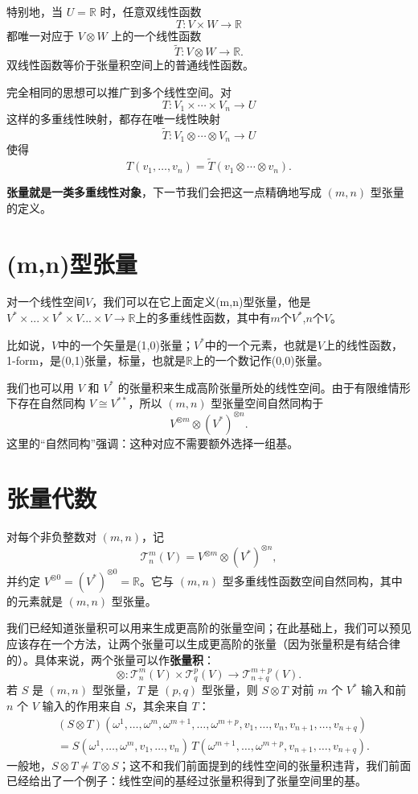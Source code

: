 \documentclass[UTF8,11pt,a4paper,fontset=fandol]{ctexart}
\numberwithin{equation}{section}
\newcommand{\R}{\mathbb R}
\newcommand{\Tspace}[2]{\mathcal T^{#1}_{#2}(V)}
\begin{document}
特别地，当 $U=\mathbb{R}$ 时，任意双线性函数
\[
T:V\times W\longrightarrow\mathbb{R}
\]
都唯一对应于 $V\otimes W$ 上的一个线性函数
\[
\widetilde T:V\otimes W\longrightarrow\mathbb{R}.
\]
双线性函数等价于张量积空间上的普通线性函数。

完全相同的思想可以推广到多个线性空间。对
\[
T:V_1\times\cdots\times V_n\longrightarrow U
\]
这样的多重线性映射，都存在唯一线性映射
\[
\widetilde T:V_1\otimes\cdots\otimes V_n\longrightarrow U
\]
使得
\[
T(v_1,\ldots,v_n)
=\widetilde T(v_1\otimes\cdots\otimes v_n).
\]

\textbf{张量就是一类多重线性对象}，下一节我们会把这一点精确地写成 $(m,n)$ 型张量的定义。
\section{(m,n)型张量}
对一个线性空间$V$，我们可以在它上面定义(m,n)型张量，他是$V^* \times ...\times V^*\times V...\times V \rightarrow \mathbb{R}$上的多重线性函数，其中有$m$个$V^*$,$n$个$V$。

比如说，$V$中的一个矢量是(1,0)张量；$V^*$中的一个元素，也就是$V$上的线性函数，1-form，是(0,1)张量，标量，也就是$\mathbb{R}$上的一个数记作(0,0)张量。

我们也可以用 $V$ 和 $V^*$ 的张量积来生成高阶张量所处的线性空间。由于有限维情形下存在自然同构 $V\cong V^{**}$，所以 $(m,n)$ 型张量空间自然同构于
\[
V^{\otimes m}\otimes (V^*)^{\otimes n}.
\]
这里的“自然同构”强调：这种对应不需要额外选择一组基。
\section{张量代数}

对每个非负整数对 $(m,n)$，记
\[
\Tspace{m}{n}=V^{\otimes m}\otimes (V^*)^{\otimes n},
\]
并约定 $V^{\otimes 0}=(V^*)^{\otimes 0}=\R$。它与 $(m,n)$ 型多重线性函数空间自然同构，其中的元素就是 $(m,n)$ 型张量。

我们已经知道张量积可以用来生成更高阶的张量空间；在此基础上，我们可以预见应该存在一个方法，让两个张量可以生成更高阶的张量（因为张量积是有结合律的）。具体来说，两个张量可以作\textbf{张量积}：
\[
\otimes:\Tspace{m}{n}\times \Tspace{p}{q}\longrightarrow \Tspace{m+p}{n+q}.
\]
若 $S$ 是 $(m,n)$ 型张量，$T$ 是 $(p,q)$ 型张量，则 $S\otimes T$ 对前 $m$ 个 $V^*$ 输入和前 $n$ 个 $V$ 输入的作用来自 $S$，其余来自 $T$：
\[
\begin{aligned}
&(S\otimes T)(\omega^1,\ldots,\omega^m,\omega^{m+1},\ldots,\omega^{m+p},
v_1,\ldots,v_n,v_{n+1},\ldots,v_{n+q})\\
&=S(\omega^1,\ldots,\omega^m,v_1,\ldots,v_n)\,
T(\omega^{m+1},\ldots,\omega^{m+p},v_{n+1},\ldots,v_{n+q}).
\end{aligned}
\]
一般地，$S\otimes T\neq T\otimes S$；这不和我们前面提到的线性空间的张量积违背，我们前面已经给出了一个例子：线性空间的基经过张量积得到了张量空间里的基。
\end{document}

